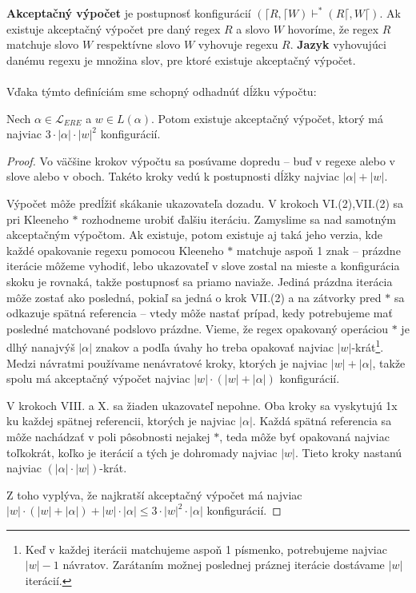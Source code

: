 \documentclass{svk_long_sk}
\def\el{\mathscr{L}_{ERE}}
\begin{document}
\textbf{Akceptačný výpočet} je postupnosť konfigurácií $(\lceil R, \lceil W) \vdash^* (R\lceil,
W\lceil)$. Ak existuje akceptačný výpočet pre daný regex $R$ a slovo $W$ hovoríme, že regex $R$ matchuje slovo $W$ respektívne slovo $W$ vyhovuje regexu $R$. \textbf{Jazyk} vyhovujúci danému regexu je množina slov, pre ktoré existuje akceptačný výpočet.
\\ \\ Vďaka týmto definíciám sme schopný odhadnúť dĺžku výpočtu:
\begin{lemma}
Nech $\alpha \in \el$ a $w \in L(\alpha)$. Potom existuje akceptačný výpočet, ktorý má najviac $3\cdot|\alpha|\cdot|w|^2$ konfigurácií.
\end{lemma}
\begin{proof}
Vo väčšine krokov výpočtu sa posúvame dopredu -- buď v regexe alebo v slove alebo v oboch. Takéto kroky vedú k postupnosti dĺžky najviac $|\alpha|+|w|$.

Výpočet môže predĺžiť skákanie ukazovateľa dozadu. V krokoch VI.(2),VII.(2) sa pri Kleeneho $*$ rozhodneme urobiť ďalšiu iteráciu. Zamyslime sa nad samotným akceptačným výpočtom. Ak existuje, potom existuje aj taká jeho verzia, kde každé opakovanie regexu pomocou Kleeneho $*$ matchuje aspoň 1 znak -- prázdne iterácie môžeme vyhodiť, lebo ukazovateľ v slove zostal na mieste a konfigurácia skoku je rovnaká, takže postupnosť sa priamo naviaže. Jediná prázdna iterácia môže zostať ako posledná, pokiaľ sa jedná o krok VII.(2) a na zátvorky pred $*$ sa odkazuje spätná referencia -- vtedy môže nastať prípad, kedy potrebujeme mať posledné matchované podslovo prázdne. Vieme, že regex opakovaný operáciou $*$ je dlhý nanajvýš $|\alpha|$ znakov a podľa úvahy ho treba opakovať najviac $|w|$-krát\footnote{Keď v každej iterácii matchujeme aspoň 1 písmenko, potrebujeme najviac $|w|-1$ návratov. Zarátaním možnej poslednej práznej iterácie dostávame $|w|$ iterácií. }. Medzi návratmi používame nenávratové kroky, ktorých je najviac $|w|+|\alpha|$, takže spolu má akceptačný výpočet najviac $|w|\cdot(|w|+|\alpha|)$ konfigurácií.

V krokoch VIII. a X. sa žiaden ukazovateľ nepohne. Oba kroky sa vyskytujú 1x ku každej spätnej referencii, ktorých je najviac $|\alpha|$. Každá spätná referencia sa môže nachádzať v poli pôsobnosti nejakej $*$, teda môže byť opakovaná najviac toľkokrát, koľko je iterácií a tých je dohromady najviac $|w|$. Tieto kroky nastanú najviac $(|\alpha|\cdot|w|)$-krát.

Z toho vyplýva, že najkratší akceptačný výpočet má najviac $|w|\cdot(|w|+|\alpha|)+|w|\cdot|\alpha| \leq 3\cdot |w|^2 \cdot |\alpha| $ konfigurácií.
\end{proof}
\end{document}
